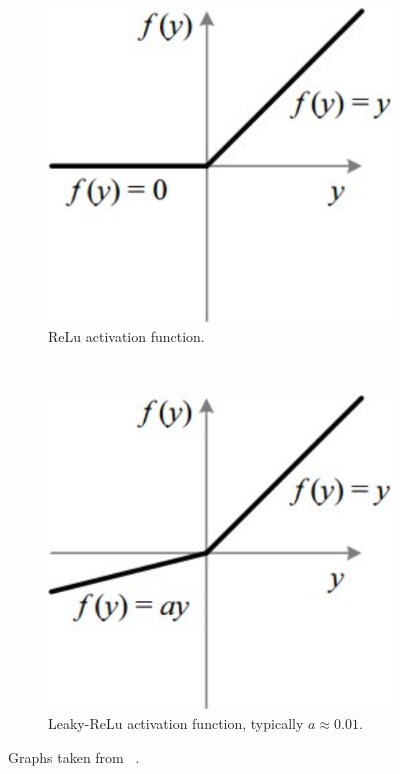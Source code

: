 \documentclass[12pt,onecolumn,letterpaper]{article}
\begin{document}
\begin{figure}[t!]
   \centering
   \begin{subfigure}[t]{0.2\textwidth}
       \centering
       \includegraphics[width=\linewidth]{figures/relu_activation_function.png}
       \caption{ReLu activation function.}
   \end{subfigure}
   ~
   \begin{subfigure}[t]{0.2\textwidth}
       \centering
       \includegraphics[width=\linewidth]{figures/leaky_relu_activation_function.png}
       \caption{Leaky-ReLu activation function, typically $a\approx0.01$.}
   \end{subfigure}
   \caption{Graphs taken from ~\cite{ReluAndLeakyReluGraphs}.}
   \label{fig:ReluAndLrActivationFunction}
\end{figure}
\end{document}
